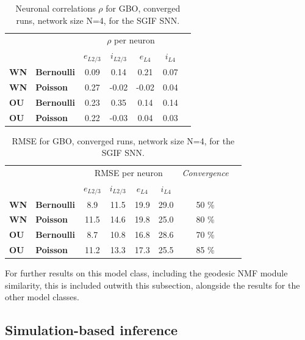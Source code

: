\documentclass[mphil,deptreport,ianc]{infthesis} %
\begin{document}
\begin{table}
\caption{Neuronal correlations $\rho$ for GBO, converged runs, network size N=4, for the SGIF SNN.}
\label{tab:rho_converged_GBO_pop}
\begin{center}
\begin{tabular}{ l l c c c c c }
 & & \multicolumn{4}{c}{$\rho$ per neuron} \\
 & & $e_{L2/3}$ & $i_{L2/3}$ & $e_{L4}$ & $i_{L4}$ \\
 \textbf{WN} & \textbf{Bernoulli} & 0.09 & 0.14 & 0.21 & 0.07 \\ 
 \textbf{WN} & \textbf{Poisson} & 0.27 & -0.02 & -0.02 & 0.04 \\  
 \textbf{OU} & \textbf{Bernoulli} & 0.23 & 0.35 & 0.14 & 0.14 \\ 
 \textbf{OU} & \textbf{Poisson} & 0.22 & -0.03 & 0.04 & 0.03 \\  
\end{tabular}
\end{center}
\end{table}

\begin{table}
\caption{RMSE for GBO, converged runs, network size N=4, for the SGIF SNN.}
\label{tab:rmse_converged_GBO_pop}
\begin{center}
\begin{tabular}{ l l c c c c c c }
& & \multicolumn{4}{c}{RMSE per neuron} & \textit{Convergence} \\
& & $e_{L2/3}$ & $i_{L2/3}$ & $e_{L4}$ & $i_{L4}$ \\
 \textbf{WN} & \textbf{Bernoulli} & 8.9 & 11.5 & 19.9 & 29.0 & 50 \% \\ 
 \textbf{WN} & \textbf{Poisson} & 11.5 & 14.6 & 19.8 & 25.0 & 80 \% \\  
 \textbf{OU} & \textbf{Bernoulli} & 8.7 & 10.8 & 16.8 & 28.6 & 70 \% \\ 
 \textbf{OU} & \textbf{Poisson} & 11.2 & 13.3 & 17.3 & 25.5 & 85 \% \\  
\end{tabular}
\end{center}
\end{table}

For further results on this model class, including the geodesic NMF module similarity, this is included outwith this subsection, alongside the results for the other model classes.



\subsection{Simulation-based inference}
\end{document}
